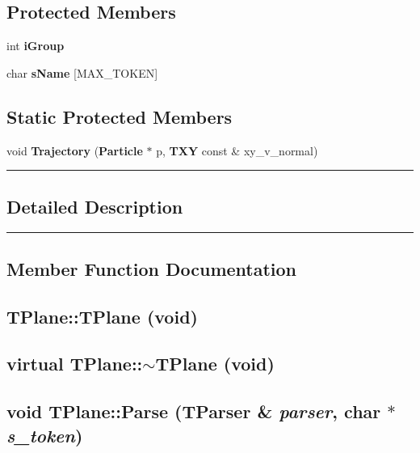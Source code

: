 \subsection*{Protected Members}
\begin{CompactItemize}
\item 
int {\bf i\-Group}
\item 
char {\bf s\-Name} [MAX\_\-TOKEN]
\end{CompactItemize}
\subsection*{Static Protected Members}
\begin{CompactItemize}
\item 
void {\bf Trajectory} ({\bf Particle} $\ast$ p, {\bf TXY} const \& xy\_\-v\_\-normal)
\end{CompactItemize}
\vspace{0.4cm}\hrule\vspace{0.2cm}
\subsection*{Detailed Description}
\vspace{0.4cm}\hrule\vspace{0.2cm}
\subsection*{Member Function Documentation}
\label{TPlane_a0}
\subsection{\setlength{\rightskip}{0pt plus 5cm}TPlane::TPlane (void)}

\label{TPlane_a1}
\subsection{\setlength{\rightskip}{0pt plus 5cm}virtual TPlane::$\sim$TPlane (void)\hspace{0.3cm}{\tt  [inline, virtual]}}

\label{TPlane_a2}
\subsection{\setlength{\rightskip}{0pt plus 5cm}void TPlane::Parse ({\bf TParser} \& {\em parser}, char $\ast$ {\em s\_\-token})\hspace{0.3cm}{\tt  [virtual]}}




